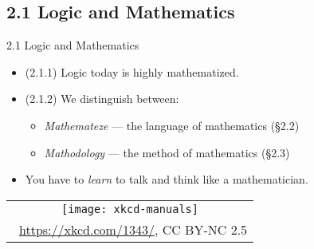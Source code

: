 \documentclass[../slides.tex]{subfiles}
\begin{document}
\subsection{2.1 Logic and Mathematics}
\begin{frame}{2.1 Logic and Mathematics}

	\begin{itemize}

		\item (2.1.1) Logic today is highly mathematized.
		
		\item (2.1.2) We distinguish between:
		
			\begin{itemize}
			
				\item \emph{Mathemateze} --- the language of mathematics (\S2.2)
				
				\item \emph{Mathodology} --- the method of mathematics (\S2.3)
			
			\end{itemize}
			
			\item You have to \emph{learn} to talk and think like a mathematician.
			

	
	\end{itemize}
	
	\begin{center}
		\begin{tabular}{c}
		\texttt{[image: xkcd-manuals]}\\[-1ex]
		{\tiny \textcopyright~\url{https://xkcd.com/1343/}, CC BY-NC 2.5}
		\end{tabular}
		\end{center}
	
\end{frame}
\end{document}
